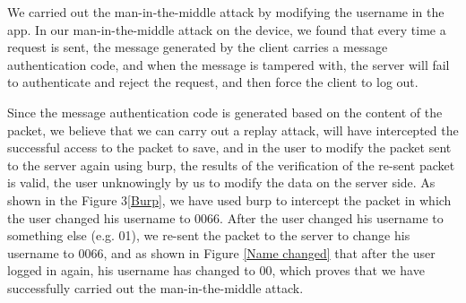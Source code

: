 \documentclass[11pt]{article}
\begin{document}
We carried out the man-in-the-middle attack by modifying the username in the app. In our man-in-the-middle attack on the device, we found that every time a request is sent, the message generated by the client carries a message authentication code, and when the message is tampered with, the server will fail to authenticate and reject the request, and then force the client to log out. \par
Since the message authentication code is generated based on the content of the packet, we believe that we can carry out a replay attack, will have intercepted the successful access to the packet to save, and in the user to modify the packet sent to the server again using burp, the results of the verification of the re-sent packet is valid, the user unknowingly by us to modify the data on the server side. As shown in the Figure 3\ref{Burp}, we have used burp to intercept the packet in which the user changed his username to 0066. After the user changed his username to something else (e.g. 01), we re-sent the packet to the server to change his username to 0066, and as shown in Figure \ref{Name changed} that after the user logged in again, his username has changed to 00, which proves that we have successfully carried out the man-in-the-middle attack.
\end{document}
